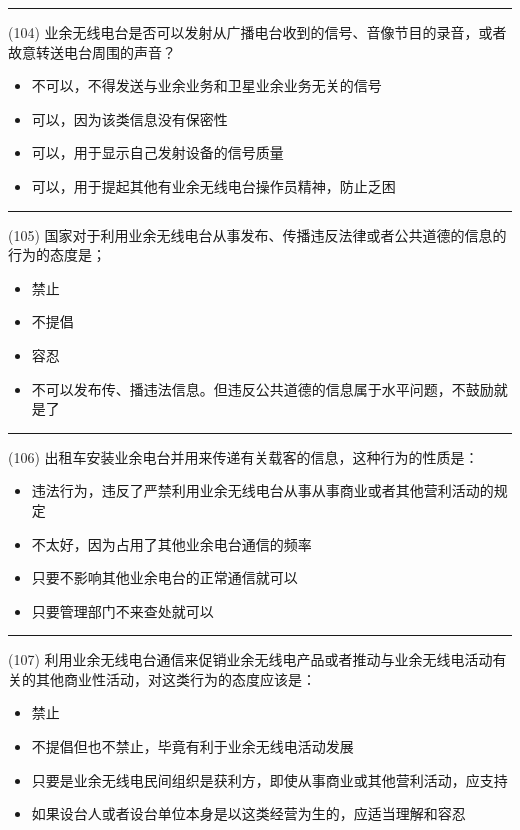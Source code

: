 \documentclass[twocolumn,hyperref,UTF8]{ctexart}  %
\begin{document}
\noindent\rule{0.5\textwidth}{1pt}
\heiti (104) 业余无线电台是否可以发射从广播电台收到的信号、音像节目的录音，或者故意转送电台周围的声音？ \songti {\color{gray} [LK0068] }
\begin{itemize}
	\item  不可以，不得发送与业余业务和卫星业余业务无关的信号
	\item  可以，因为该类信息没有保密性
	\item  可以，用于显示自己发射设备的信号质量
	\item  可以，用于提起其他有业余无线电台操作员精神，防止乏困
\end{itemize}


\noindent\rule{0.5\textwidth}{1pt}
\heiti (105) 国家对于利用业余无线电台从事发布、传播违反法律或者公共道德的信息的行为的态度是； \songti {\color{gray} [LK0069] }
\begin{itemize}
	\item  禁止
	\item  不提倡
	\item  容忍
	\item  不可以发布传、播违法信息。但违反公共道德的信息属于水平问题，不鼓励就是了
\end{itemize}


\noindent\rule{0.5\textwidth}{1pt}
\heiti (106) 出租车安装业余电台并用来传递有关载客的信息，这种行为的性质是： \songti {\color{gray} [LK0070] }
\begin{itemize}
	\item  违法行为，违反了严禁利用业余无线电台从事从事商业或者其他营利活动的规定
	\item  不太好，因为占用了其他业余电台通信的频率
	\item  只要不影响其他业余电台的正常通信就可以
	\item  只要管理部门不来查处就可以
\end{itemize}


\noindent\rule{0.5\textwidth}{1pt}
\heiti (107) 利用业余无线电台通信来促销业余无线电产品或者推动与业余无线电活动有关的其他商业性活动，对这类行为的态度应该是： \songti {\color{gray} [LK0071] }
\begin{itemize}
	\item  禁止
	\item  不提倡但也不禁止，毕竟有利于业余无线电活动发展
	\item  只要是业余无线电民间组织是获利方，即使从事商业或其他营利活动，应支持
	\item  如果设台人或者设台单位本身是以这类经营为生的，应适当理解和容忍
\end{itemize}
\end{document}
